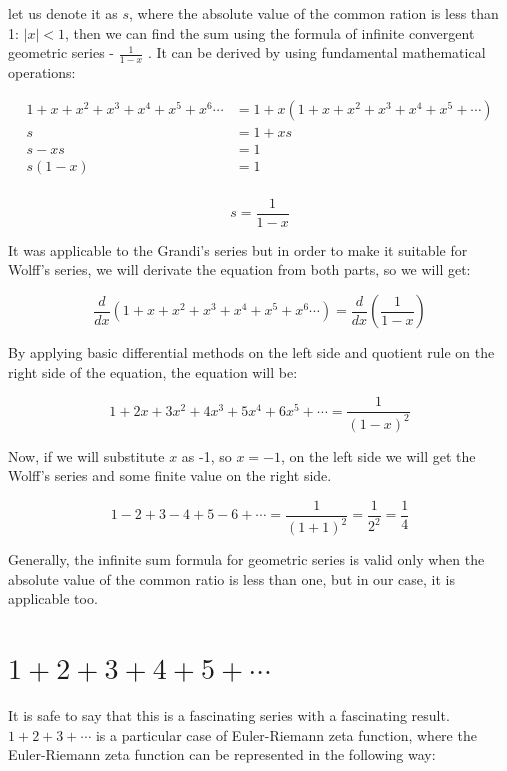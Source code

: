 \documentclass[a4paper]{article}
\begin{document}
let us denote it as $s$,
where the absolute value of the common ration is less than 1: $|x| < 1$, then we
can find the sum using the formula of infinite convergent geometric series -
$\frac{1}{1-x}$ . It can be derived by using fundamental mathematical
operations: 

\begin{align*}
  1+x+x^2+x^3+x^4+x^5+x^6\cdots&=1+x(1+x+x^2+x^3+x^4+x^5+\cdots)\\
  s&=1+xs\\
  s-xs&=1\\
  s(1-x)&=1\\
\end{align*}

\begin{equation}
  s=\frac{1}{1-x}
  \end{equation}

It was applicable to the Grandi's series but in order to make it suitable for
Wolff's series, we will derivate the equation from both parts, so we will get: 

\begin{equation*}
  \frac{d}{dx}(1+x+x^2+x^3+x^4+x^5+x^6\cdots)=\frac{d}{dx}(\frac{1}{1-x})
  \end{equation*}

By applying basic differential methods on the left side and quotient rule on the
right side of the equation, the equation will be:

\begin{equation*}
  1+2x+3x^2+4x^3+5x^4+6x^5+\cdots=\frac{1}{(1-x)^2}
  \end{equation*}

Now, if we will substitute $x$ as -1, so $x=-1$, on the left side we will get
the Wolff's series and some finite value on the right side.

\begin{equation}
  1-2+3-4+5-6+\cdots=\frac{1}{(1+1)^2}=\frac{1}{2^2}=\frac{1}{4}
  \label{Wolff}
\end{equation}

Generally, the infinite sum formula for geometric series is valid only when the
absolute value of the common ratio is less than one, but in our case, it is
applicable too. 

\section{$1+2+3+4+5+\cdots$}
\label{sec-4}

It is safe to say that this is a fascinating series with a fascinating
result. $1+2+3+\cdots$ is a particular case of Euler-Riemann zeta function, where
the Euler-Riemann zeta function can be represented in the following way:
\end{document}
